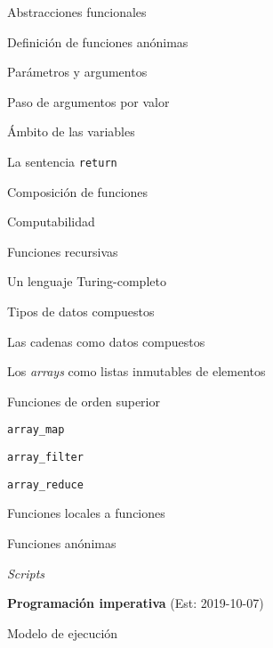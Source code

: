 \begin{longenum}
    \begin{longenum}
        \item Abstracciones funcionales
        \begin{longenum}
            \item Definición de funciones anónimas
            \item Parámetros y argumentos
            \item Paso de argumentos por valor
            \item Ámbito de las variables
            \item La sentencia \texttt{return}
        \end{longenum}
        \item Composición de funciones
        \item Computabilidad
        \begin{longenum}
            \item Funciones recursivas
            \item Un lenguaje Turing-completo
        \end{longenum}
        \item Tipos de datos compuestos
        \begin{longenum}
            \item Las cadenas como datos compuestos
            \item Los \textit{arrays} como listas inmutables de elementos
        \end{longenum}
        \item Funciones de orden superior
        \begin{longenum}
            \item \texttt{array\_map}
            \item \texttt{array\_filter}
            \item \texttt{array\_reduce}
            \item Funciones locales a funciones
            \item Funciones anónimas
        \end{longenum}
        \item \textit{Scripts}
    \end{longenum}
    \item \textbf{Programación imperativa}  (Est: 2019-10-07)
    \begin{longenum}
        \item Modelo de ejecución
        \begin{longenum}

\end{longenum}
\end{longenum}
\end{longenum}
